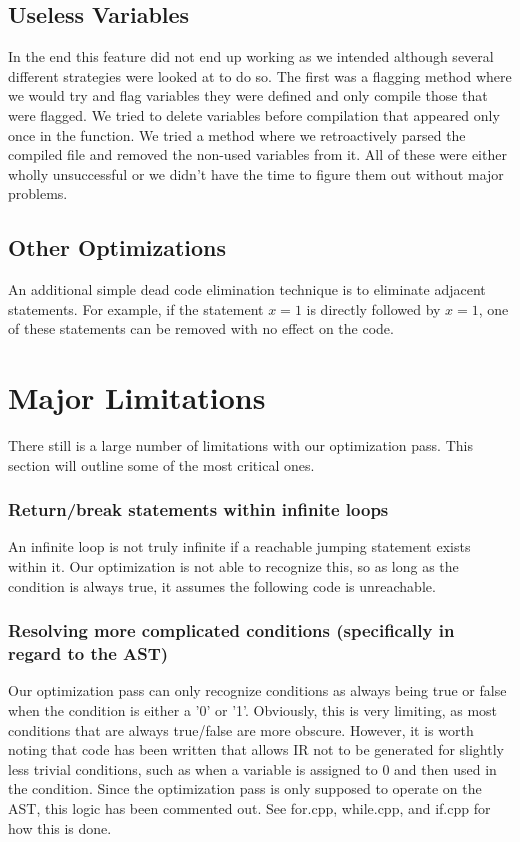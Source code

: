 \documentclass[sigconf]{acmart}
\begin{document}
\subsection{Useless Variables}
In the end this feature did not end up working as we intended although several different strategies were looked at to do so. 
The first was a flagging method where we would try and flag variables they were defined and only compile those that were flagged. 
We tried to delete variables before compilation that appeared only once in the function. We tried a method where we retroactively 
parsed the compiled file and removed the non-used variables from it. All of these were either wholly
unsuccessful or we didn't have the time to figure them out without major problems.  

\subsection{Other Optimizations}
An additional simple dead code elimination technique is to eliminate adjacent statements.
For example, if the statement $x = 1$ is directly followed by $x = 1$, one of these statements can be removed with 
no effect on the code.

\section{Major Limitations}
There still is a large number of limitations with our optimization pass. This section will outline some of the 
most critical ones.

\subsubsection{Return/break statements within infinite loops}
An infinite loop is not truly infinite if a reachable jumping statement exists within it. 
Our optimization is not able to recognize this, so as long as the condition is always true, it assumes 
the following code is unreachable. 

\subsubsection{Resolving more complicated conditions (specifically in regard to the AST)}
Our optimization pass can only recognize conditions as always being true or false when the condition is either a 
'0' or '1'. Obviously, this is very limiting, as most conditions that are always true/false are more obscure. However, it is worth noting that code has been written that allows IR not to be generated for slightly less 
trivial conditions, such as when a variable is assigned to 0 and then used in the condition. 
Since the optimization pass is only supposed to operate on the AST, this logic has been commented out. See for.cpp, while.cpp, and 
if.cpp for how this is done.
\end{document}
